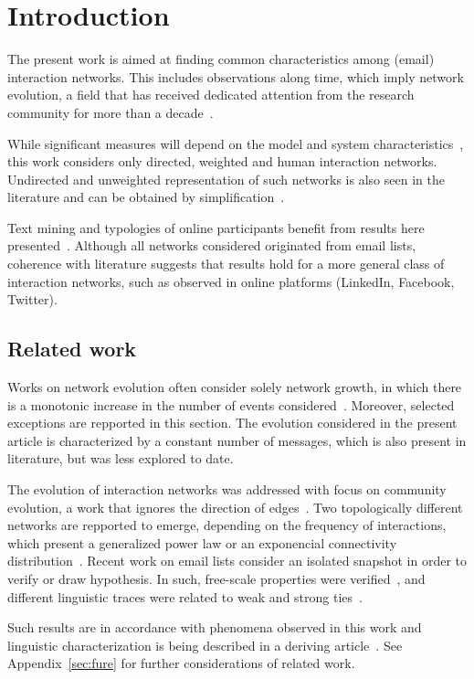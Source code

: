 \documentclass[%
 aip,
 jmp,%
 amsmath,amssymb,
 reprint,%
]{revtex4-1}
\begin{document}
\section{\label{sec:into}Introduction}
The present work is aimed at finding common characteristics among (email) interaction networks. This includes observations along time, which imply network evolution, a field that has received dedicated attention from the research community
for more than a decade~\cite{barabasiEvo,newmanEvolving}.


While significant measures will depend on the model and system characteristics~\cite{newmanStru, newmanWeight},
this work considers only directed, weighted and human interaction networks. Undirected and unweighted representation of such networks is also seen in the literature and can be obtained by simplification~\cite{GMANE2}.

Text mining and typologies of online participants benefit from results here presented~\cite{rcText,rcTipo}. 
Although all networks considered originated from email lists,
 coherence with literature suggests that results hold for a more general class of interaction networks,
 such as observed in online platforms (LinkedIn, Facebook, Twitter).


\subsection{Related work}
 Works on network evolution often consider solely network growth, in which there is a monotonic increase in the number of events considered~\cite{barabasiEvo}. Moreover, selected exceptions are repported in this section.
The evolution considered in the present article is characterized by a constant number of messages, which is also present in literature, but was less explored to date.

 The evolution of interaction networks was addressed with focus on community evolution, a work that ignores the direction of edges~\cite{barabasiEvo}. Two topologically different networks are repported to emerge, depending on the frequency of interactions, which present a generalized power law or an exponencial connectivity distribution~\cite{barabasiTopologicalEv}. 
Recent work on email lists consider an isolated snapshot in order to verify or draw hypothesis. In such, free-scale properties were verified~\cite{bird}, and different linguistic traces were related to weak and strong ties~\cite{GMANE2}.

 Such results are in accordance with phenomena observed in this work and linguistic characterization is being described in a deriving article~\cite{rcText}. See Appendix~\ref{sec:fure} for further considerations of related work.
\end{document}
